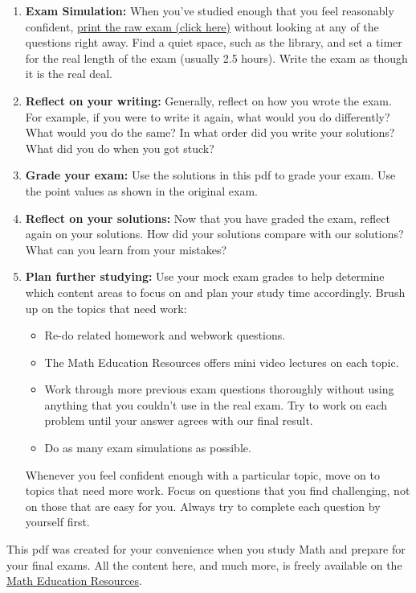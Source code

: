 \begin{enumerate}
\item {\bf Exam Simulation:} When you've studied enough that you feel reasonably confident, \href{\examURL}{print the raw exam (click here)} without looking at any of the questions right away.  Find a quiet space, such as the library, and set a timer for the real length of the exam (usually 2.5 hours).  Write the exam as though it is the real deal.
\item {\bf Reflect on your writing:} Generally, reflect on how you wrote the exam.  For example, if you were to write it again, what would you do differently?  What would you do the same?  In what order did you write your solutions? What did you do when you got stuck?
\item {\bf Grade your exam:} Use the solutions in this pdf to grade your exam.  Use the point values as shown in the original exam.
\item {\bf Reflect on your solutions:} Now that you have graded the exam, reflect again on your solutions.  How did your solutions compare with our solutions?  What can you learn from your mistakes?
\item {\bf Plan further studying:} Use your mock exam grades to help determine which content areas to focus on and plan your study time accordingly. Brush up on the topics that need work:
\begin{itemize}
\item Re-do related homework and webwork questions.
\item The Math Education Resources offers mini video lectures on each topic.
\item Work through more previous exam questions thoroughly without using anything that you couldn't use in the real exam. Try to work on each problem until your answer agrees with our final result.
\item Do as many exam simulations as possible.
\end{itemize}
Whenever you feel confident enough with a particular topic, move on to topics that need more work. Focus on questions that you find challenging, not on those that are easy for you. Always try to complete each question by yourself first.
\end{enumerate}

\vfill

{\small This pdf was created for your convenience when you study Math and prepare for your final exams. All the content here, and much more, is freely available on the \href{http://www.math-education-resources.com}{Math Education Resources}.}

